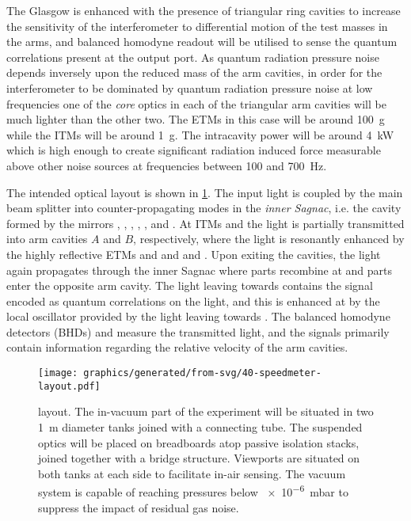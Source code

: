 The Glasgow \SSMEXPT{} is enhanced with the presence of triangular ring cavities to increase the sensitivity of the interferometer to differential motion of the test masses in the arms, and balanced homodyne readout will be utilised to sense the quantum correlations present at the output port. As quantum radiation pressure noise depends inversely upon the reduced mass of the arm cavities, in order for the interferometer to be dominated by quantum radiation pressure noise at low frequencies one of the \emph{core} optics in each of the triangular arm cavities will be much lighter than the other two. The \glspl{ETM} in this case will be around \SI{100}{\gram} while the \glspl{ITM} will be around \SI{1}{\gram}. The intracavity power will be around \SI{4}{\kilo\watt} which is high enough to create significant radiation induced force measurable above other noise sources at frequencies between \num{100} and \SI{700}{\hertz}.

The intended optical layout is shown in \cref{fig:ssm-layout}. The input light is coupled by the main beam splitter \MSIX{} into counter-propagating modes in the \emph{inner Sagnac}, i.e. the cavity formed by the mirrors \MSIX{}, \MSEVEN{}, \MONEA{}, \MTEN{}, \MNINE{}, \MEIGHT{} and \MONEB{}. At \glspl{ITM} \MONEA{} and \MONEB{} the light is partially transmitted into arm cavities $A$ and $B$, respectively, where the light is resonantly enhanced by the highly reflective \glspl{ETM} \MTWOA{} and \MTHREEA{} and \MTWOB{} and \MTHREEB{}. Upon exiting the cavities, the light again propagates through the inner Sagnac where parts recombine at \MSIX{} and parts enter the opposite arm cavity. The light leaving \MSIX{} towards \MFOURTEEN{} contains the signal encoded as quantum correlations on the light, and this is enhanced at \MSIXTEEN{} by the local oscillator provided by the light leaving \MSIX{} towards \MTWELVE{}. The balanced homodyne detectors (\glspl{BHD}) \HDA{} and \HDB{} measure the transmitted light, and the signals primarily contain information regarding the relative velocity of the arm cavities.

\begin{figure}
  \centering
  \texttt{[image: graphics/generated/from-svg/40-speedmeter-layout.pdf]}
  \caption[\SSMEXPT{} layout]{\label{fig:ssm-layout}\SSMEXPT{} layout. The in-vacuum part of the experiment will be situated in two \SI{1}{\meter} diameter tanks joined with a connecting tube. The suspended optics will be placed on breadboards atop passive isolation stacks, joined together with a bridge structure. Viewports are situated on both tanks at each side to facilitate in-air sensing. The vacuum system is capable of reaching pressures below \SI{e-6}{\milli\bar} to suppress the impact of residual gas noise.}
\end{figure}

